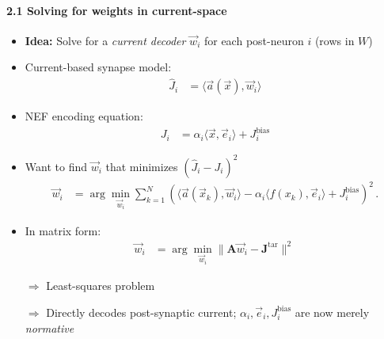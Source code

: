 \documentclass[10pt,letterpaper]{article}
\newcommand{\mat}[1]{\mathbf{#1}}
\begin{document}
\paragraph{2.1 Solving for weights in current-space}
\begin{itemize}
	\item \textbf{Idea:} Solve for a \emph{current decoder} $\vec w_i$ for each post-neuron $i$ (rows in $W$)
	\item Current-based synapse model:
	\begin{align*}
		\hat J_i &= \langle \vec a(\vec x), \vec w_i \rangle
	\end{align*}
	\item NEF encoding equation:
	\begin{align*}
		J_i &= \alpha_i \langle \vec x, \vec e_i \rangle + J^\mathrm{bias}_i
	\end{align*}
	\item Want to find $\vec w_i$ that minimizes $(\hat J_i - J_i)^2$
	\begin{align*}
		\vec w_i &= \arg\min_{\vec w_i} \sum_{k = 1}^N \left( \big\langle \vec a(\vec x_k), \vec w_i \big\rangle - \alpha_i \big\langle f(x_k), \vec e_i \big\rangle + J^\mathrm{bias}_i \right)^2 \,.
	\end{align*}
	\item In matrix form:
	\begin{align*}
		\vec w_i &= \arg\min_{\vec w_i} \big\| \mat A \vec w_i - \mat J^\mathrm{tar} \big\|^2 \,
	\end{align*}
	\item[$\Rightarrow$] Least-squares problem
	\item[$\Rightarrow$] Directly decodes post-synaptic current; $\alpha_i, \vec e_i, J^\mathrm{bias}_i$ are now merely \emph{normative}
\end{itemize}
\end{document}
